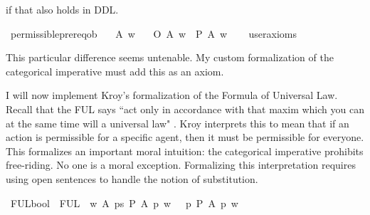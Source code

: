\begin{isabellebody}
\begin{isamarkuptext}
if that also holds in DDL.%
\end{isamarkuptext}\isamarkuptrue%
\isamarkupfalse%
\ permissible{\isacharunderscore}prereq{\isacharunderscore}ob{\isacharcolon}\isanewline
\ \ \ A\ w\isanewline
\ \ \ {\isachardoublequoteopen}O\ {\isacharbraceleft}A{\isacharbraceright}\ w\ {\isasymlongrightarrow}\ P\ {\isacharbraceleft}A{\isacharbraceright}\ w{\isachardoublequoteclose}\isanewline
\ \ \isamarkupfalse%
\ {\isacharbrackleft}user{\isacharunderscore}axioms{\isacharbrackright}%
\isadelimproof
\ %
\endisadelimproof
%
\isatagproof
{}\isamarkupfalse%
\isanewline
%
%
\endisatagproof
{\isafoldproof}%
%
\isadelimproof
%
\endisadelimproof
%
\begin{isamarkuptext}%
This particular difference seems untenable. My custom formalization of the categorical imperative 
must add this as an axiom.%
\end{isamarkuptext}\isamarkuptrue%
%
\isadelimdocument
%
\endisadelimdocument
%
\isatagdocument
%
\isamarkuptrue%
%
\endisatagdocument
{\isafolddocument}%
%
\isadelimdocument
%
\endisadelimdocument
%
\begin{isamarkuptext}%
I will now implement Kroy's formalization of the Formula of Universal Law. Recall that the FUL says
``act only in accordance with that maxim which you can at the same time will a universal law" \cite{groundwork}.
Kroy interprets this to mean that if an action is permissible for a specific agent, then it must be permissible for everyone.
This formalizes an important moral intuition: the categorical imperative prohibits free-riding. No one is a moral exception.
Formalizing this interpretation requires using open sentences to handle the notion of substitution.%
\end{isamarkuptext}\isamarkuptrue%
\isamarkupfalse%
\ FUL{\isacharcolon}{\isacharcolon}{\isachardoublequoteopen}bool{\isachardoublequoteclose}\ \ {\isachardoublequoteopen}FUL\ {\isasymequiv}\ {\isasymforall}w\ A{\isachardot}\ {\isacharparenleft}{\isacharparenleft}{\isasymexists}p{\isacharcolon}{\isacharcolon}s{\isachardot}\ {\isacharparenleft}{\isacharparenleft}P\ {\isacharbraceleft}A\ p{\isacharbraceright}{\isacharparenright}\ w{\isacharparenright}{\isacharparenright}\ \ {\isasymlongrightarrow}{\isacharparenleft}\ {\isacharparenleft}{\isasymforall}p{\isachardot}{\isacharparenleft}\ P\ {\isacharbraceleft}A\ p{\isacharbraceright}{\isacharparenright}\ w{\isacharparenright}{\isacharparenright}{\isacharparenright}\ {\isachardoublequoteclose}%

\end{isabellebody}
